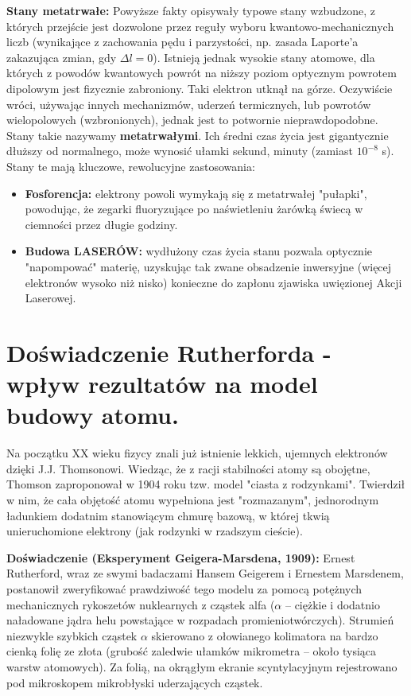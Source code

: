 \documentclass[11pt, a4paper]{article}
\begin{document}
\textbf{Stany metatrwałe:}
Powyższe fakty opisywały typowe stany wzbudzone, z których przejście jest dozwolone przez reguły wyboru kwantowo-mechanicznych liczb (wynikające z zachowania pędu i parzystości, np. zasada Laporte'a zakazująca zmian, gdy $\Delta l = 0$).
Istnieją jednak wysokie stany atomowe, dla których z powodów kwantowych powrót na niższy poziom optycznym powrotem dipolowym jest fizycznie zabroniony. Taki elektron utknął na górze. Oczywiście wróci, używając innych mechanizmów, uderzeń termicznych, lub powrotów wielopolowych (wzbronionych), jednak jest to potwornie nieprawdopodobne. 
Stany takie nazywamy \textbf{metatrwałymi}. Ich średni czas życia jest gigantycznie dłuższy od normalnego, może wynosić ułamki sekund, minuty (zamiast $10^{-8}$ s). Stany te mają kluczowe, rewolucyjne zastosowania:
\begin{itemize}
    \item \textbf{Fosforencja:} elektrony powoli wymykają się z metatrwałej "pułapki", powodując, że zegarki fluoryzujące po naświetleniu żarówką świecą w ciemności przez długie godziny.
    \item \textbf{Budowa LASERÓW:} wydłużony czas życia stanu pozwala optycznie "napompować" materię, uzyskując tak zwane obsadzenie inwersyjne (więcej elektronów wysoko niż nisko) konieczne do zapłonu zjawiska uwięzionej Akcji Laserowej.
\end{itemize}

\section{Doświadczenie Rutherforda - wpływ rezultatów na model budowy atomu.}

Na początku XX wieku fizycy znali już istnienie lekkich, ujemnych elektronów dzięki J.J. Thomsonowi. Wiedząc, że z racji stabilności atomy są obojętne, Thomson zaproponował w 1904 roku tzw. model "ciasta z rodzynkami". Twierdził w nim, że cała objętość atomu wypełniona jest "rozmazanym", jednorodnym ładunkiem dodatnim stanowiącym chmurę bazową, w której tkwią unieruchomione elektrony (jak rodzynki w rzadszym cieście). 

\textbf{Doświadczenie (Eksperyment Geigera-Marsdena, 1909):}
Ernest Rutherford, wraz ze swymi badaczami Hansem Geigerem i Ernestem Marsdenem, postanowił zweryfikować prawdziwość tego modelu za pomocą potężnych mechanicznych rykoszetów nuklearnych z cząstek alfa ($\alpha$ – ciężkie i dodatnio naładowane jądra helu powstające w rozpadach promieniotwórczych). Strumień niezwykle szybkich cząstek $\alpha$ skierowano z ołowianego kolimatora na bardzo cienką folię ze złota (grubość zaledwie ułamków mikrometra – około tysiąca warstw atomowych). Za folią, na okrągłym ekranie scyntylacyjnym rejestrowano pod mikroskopem mikrobłyski uderzających cząstek. 
\end{document}
